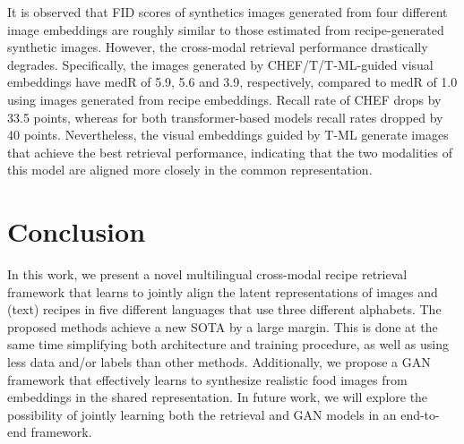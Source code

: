 \documentclass[sigconf,nonacm]{acmart}
\begin{document}
It is observed that FID scores of synthetics images generated from four different image embeddings are roughly similar to those estimated from recipe-generated synthetic images. However, the cross-modal retrieval performance drastically degrades. Specifically, the images generated by CHEF/T/T-ML-guided visual embeddings have medR of 5.9, 5.6 and 3.9, respectively, compared to medR of 1.0 using images generated from recipe embeddings. Recall rate of CHEF drops by 33.5 points, whereas for both transformer-based models recall rates dropped by 40 points. Nevertheless, the visual embeddings guided by T-ML generate images that achieve the best retrieval performance, indicating that the two modalities of this model are aligned more closely in the common representation.

\section{Conclusion}

In this work, we present a novel multilingual cross-modal recipe retrieval framework that learns to jointly align the latent representations of images and (text) recipes in five different languages that use three different alphabets. The proposed methods achieve a new SOTA by a large margin. This is done at the same time simplifying both architecture and training procedure, as well as using less data and/or labels than other methods. Additionally, we propose a GAN framework that effectively learns to synthesize realistic food images from embeddings in the shared representation. In future work, we will explore the possibility of jointly learning both the retrieval and GAN models in an end-to-end framework.













\onecolumn
\section*{}
\vspace{3em}
\end{document}
